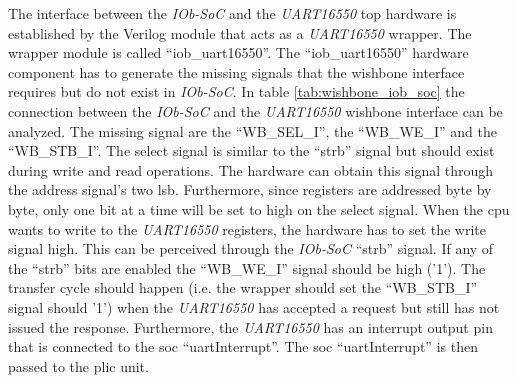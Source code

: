 The interface between the \textit{IOb-SoC} and the \textit{UART16550} top hardware is established by the Verilog module that acts as a \textit{UART16550} wrapper. The wrapper module is called \enquote{iob\_uart16550}. The \enquote{iob\_uart16550} hardware component has to generate the missing signals that the wishbone interface requires but do not exist in \textit{IOb-SoC}. In table \ref{tab:wishbone_iob_soc} the connection between the \textit{IOb-SoC} and the \textit{UART16550} wishbone interface can be analyzed. The missing signal are the \enquote{WB\_SEL\_I}, the \enquote{WB\_WE\_I} and the \enquote{WB\_STB\_I}. The select signal is similar to the \enquote{strb} signal but should exist during write and read operations. The hardware can obtain this signal through the address signal's two \acrfull{lsb}. Furthermore, since registers are addressed byte by byte, only one bit at a time will be set to high on the select signal. When the \acrshort{cpu} wants to write to the \textit{UART16550} registers, the hardware has to set the write signal high. This can be perceived through the \textit{IOb-SoC} \enquote{strb} signal. If any of the \enquote{strb} bits are enabled the \enquote{WB\_WE\_I} signal should be high ('1'). The transfer cycle should happen (i.e. the wrapper should set the \enquote{WB\_STB\_I} signal should '1') when the \textit{UART16550} has accepted a request but still has not issued the response. Furthermore, the \textit{UART16550} has an interrupt output pin that is connected to the \acrshort{soc} \enquote{uartInterrupt}. The \acrshort{soc} \enquote{uartInterrupt} is then passed to the \acrshort{plic} unit.

